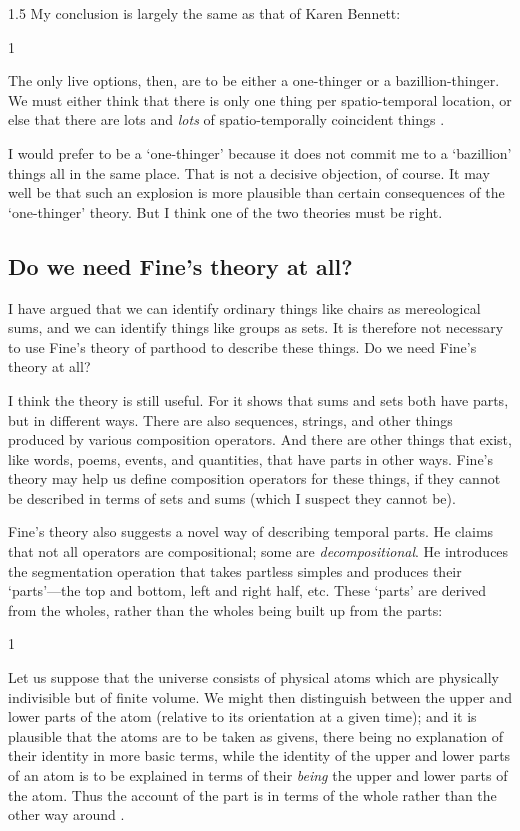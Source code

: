 \documentclass[11pt]{article}
\newenvironment{squote}{%
\begin{spacing}{1}
\begin{list}{}{%
\setlength{\labelwidth}{0pt}%
\rightmargin\leftmargin%
}
\item\relax
}{%
\end{list}%
\end{spacing}
}
\begin{document}
\begin{spacing}{1.5}
My conclusion is largely the same as that of Karen Bennett:

\begin{squote}
The only live options, then, are to be either a one-thinger or a
bazillion-thinger.  We must either think that there is only one thing per
spatio-temporal location, or else that there are lots and \emph{lots} of
spatio-temporally coincident things \citeyearpar[358]{bennett2004}.
\end{squote}

I would prefer to be a `one-thinger' because it does not commit me to
a `bazillion' things all in the same place.  That is not a decisive
objection, of course.  It may well be that such an explosion is more
plausible than certain consequences of the `one-thinger' theory.  But
I think one of the two theories must be right.

\subsection{Do we need Fine's theory at all?}
I have argued that we can identify ordinary things like chairs as
mereological sums, and we can identify things like groups as sets.  It
is therefore not necessary to use Fine's theory of parthood to
describe these things.  Do we need Fine's theory at all?

I think the theory is still useful.  For it shows that sums and sets
both have parts, but in different ways.  There are also sequences,
strings, and other things produced by various composition operators.
And there are other things that exist, like words, poems, events, and
quantities, that have parts in other ways.  Fine's theory may help us
define composition operators for these things, if they cannot be
described in terms of sets and sums (which I suspect they cannot be).

Fine's theory also suggests a novel way of describing temporal parts.
He claims that not all operators are compositional; some are {\em
  decompositional}.  He introduces the segmentation operation that
takes partless simples and produces their `parts'---the top and
bottom, left and right half, etc.  These `parts' are derived from the
wholes, rather than the wholes being built up from the parts:

\begin{squote}
Let us suppose that the universe consists of physical atoms which are
physically indivisible but of finite volume.  We might then
distinguish between the upper and lower parts of the atom (relative to
its orientation at a given time); and it is plausible that the atoms
are to be taken as givens, there being no explanation of their
identity in more basic terms, while the identity of the upper and
lower parts of an atom is to be explained in terms of their {\em
  being} the upper and lower parts of the atom.  Thus the account of
the part is in terms of the whole rather than the other way around
\citep[585]{fine2010}.
\end{squote}


\end{spacing}
\end{document}
